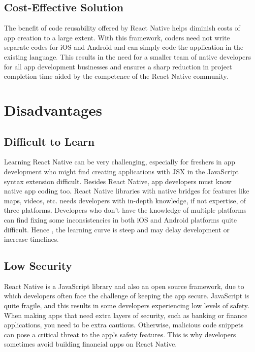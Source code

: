 \documentclass[12pt,a4paper]{report}
\begin{document}
\subsection{Cost-Effective Solution}
The benefit of code reusability offered by React Native helps diminish costs of app creation to a large extent. With this framework, coders need not write separate codes for iOS and Android and can simply code the application in the existing language. This results in the need for a smaller team of native developers for all app development businesses and ensures a sharp reduction in project completion time aided by the competence of the React Native community.

\newpage

\section{Disadvantages}

\subsection{Difficult to Learn}
Learning React Native can be very challenging, especially for freshers in app development who might find creating applications with JSX in the JavaScript syntax extension difficult. Besides React Native, app developers must know native app coding too. React Native libraries with native bridges for features like maps, videos, etc. needs developers with in-depth knowledge, if not expertise, of three platforms. Developers who don’t have the knowledge of multiple platforms can find fixing some inconsistencies in both iOS and Android platforms quite difficult. Hence , the learning curve is steep and may delay development or increase timelines.

\subsection{Low Security}
React Native is a JavaScript library and also an open source framework, due to which developers often face the challenge of keeping the app secure. JavaScript is quite fragile, and this results in some developers experiencing low levels of safety. When making apps that need extra layers of security, such as banking or finance applications, you need to be extra cautious. Otherwise, malicious code snippets can pose a critical threat to the app’s safety features. This is why developers sometimes avoid building financial apps on React Native.
\end{document}

